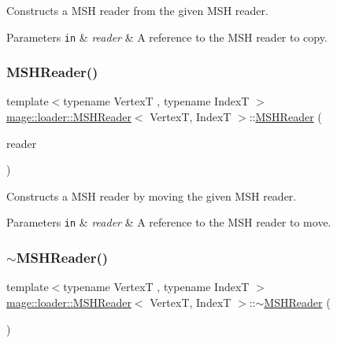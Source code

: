 Constructs a M\+SH reader from the given M\+SH reader.


\begin{DoxyParams}[1]{Parameters}
\mbox{\tt in}  & {\em reader} & A reference to the M\+SH reader to copy. \\
\hline
\end{DoxyParams}
\hypertarget{classmage_1_1loader_1_1_m_s_h_reader_a32644c53ec25e716d4d9a3387b94f2c3}{}\label{classmage_1_1loader_1_1_m_s_h_reader_a32644c53ec25e716d4d9a3387b94f2c3} 
\subsubsection{\texorpdfstring{M\+S\+H\+Reader()}{MSHReader()}\hspace{0.1cm}{\footnotesize\ttfamily [3/3]}}
{\footnotesize\ttfamily template$<$typename VertexT , typename IndexT $>$ \\
\hyperlink{classmage_1_1loader_1_1_m_s_h_reader}{mage\+::loader\+::\+M\+S\+H\+Reader}$<$ VertexT, IndexT $>$\+::\hyperlink{classmage_1_1loader_1_1_m_s_h_reader}{M\+S\+H\+Reader} (\begin{DoxyParamCaption}\item[{\hyperlink{classmage_1_1loader_1_1_m_s_h_reader}{M\+S\+H\+Reader}$<$ VertexT, IndexT $>$ \&\&}]{reader }\end{DoxyParamCaption})\hspace{0.3cm}{\ttfamily [noexcept]}}

Constructs a M\+SH reader by moving the given M\+SH reader.


\begin{DoxyParams}[1]{Parameters}
\mbox{\tt in}  & {\em reader} & A reference to the M\+SH reader to move. \\
\hline
\end{DoxyParams}
\hypertarget{classmage_1_1loader_1_1_m_s_h_reader_a7176387987a85f7d5560b50f5aff7a43}{}\label{classmage_1_1loader_1_1_m_s_h_reader_a7176387987a85f7d5560b50f5aff7a43} 
\subsubsection{\texorpdfstring{$\sim$\+M\+S\+H\+Reader()}{~MSHReader()}}
{\footnotesize\ttfamily template$<$typename VertexT , typename IndexT $>$ \\
\hyperlink{classmage_1_1loader_1_1_m_s_h_reader}{mage\+::loader\+::\+M\+S\+H\+Reader}$<$ VertexT, IndexT $>$\+::$\sim$\hyperlink{classmage_1_1loader_1_1_m_s_h_reader}{M\+S\+H\+Reader} (\begin{DoxyParamCaption}{ }\end{DoxyParamCaption})}

